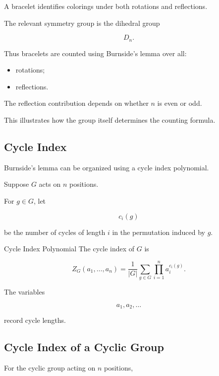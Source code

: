 A bracelet identifies colorings under both rotations and reflections.

The relevant symmetry group is the dihedral group

\[
D_n.
\]

Thus bracelets are counted using Burnside's lemma over all:

\begin{itemize}
    \item rotations;
    \item reflections.
\end{itemize}

The reflection contribution depends on whether \(n\) is even or odd.

This illustrates how the group itself determines the counting formula.

\subsection{Cycle Index}
\label{subsec:cycle-index}

Burnside's lemma can be organized using a cycle index polynomial.

Suppose \(G\) acts on \(n\) positions.

For \(g\in G\), let

\[
c_i(g)
\]

be the number of cycles of length \(i\) in the permutation induced by
\(g\).

\begin{definitionbox}{Cycle Index Polynomial}
The cycle index of \(G\) is

\[
\boxed{
Z_G(a_1,\ldots,a_n)
=
\frac{1}{|G|}
\sum_{g\in G}
\prod_{i=1}^{n}
a_i^{c_i(g)}.
}
\]
\end{definitionbox}

The variables

\[
a_1,a_2,\ldots
\]

record cycle lengths.

\subsection{Cycle Index of a Cyclic Group}
\label{subsec:cycle-index-cyclic}

For the cyclic group acting on \(n\) positions,

